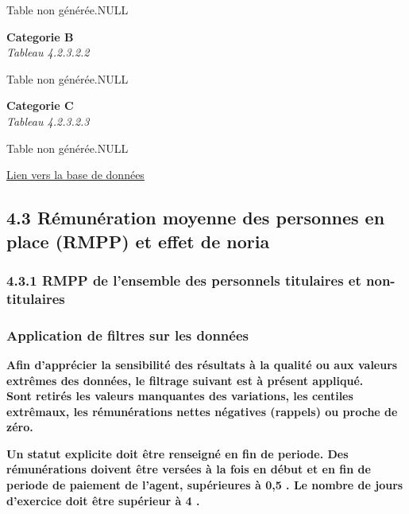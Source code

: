 Table non générée.NULL

\textbf{Categorie B}\\
\hspace*{0.333em}\emph{Tableau 4.2.3.2.2}

Table non générée.NULL

\textbf{Categorie C}\\
\hspace*{0.333em}\emph{Tableau 4.2.3.2.3}

Table non générée.NULL

\href{../Bases/Remunerations/Analyse.variations.par.exercice.csv}{Lien vers
la base de données}

\hypertarget{remuneration-moyenne-des-personnes-en-place-rmpp-et-effet-de-noria}{%
\subsection{4.3 Rémunération moyenne des personnes en place (RMPP) et
effet de
noria}\label{remuneration-moyenne-des-personnes-en-place-rmpp-et-effet-de-noria}}

\hypertarget{rmpp-de-lensemble-des-personnels-titulaires-et-non-titulaires}{%
\subsubsection{4.3.1 RMPP de l'ensemble des personnels titulaires et
non-titulaires}\label{rmpp-de-lensemble-des-personnels-titulaires-et-non-titulaires}}

\hypertarget{application-de-filtres-sur-les-donnees}{%
\subsubsection{Application de filtres sur les
données}\label{application-de-filtres-sur-les-donnees}}

\textbf{Afin d'apprécier la sensibilité des résultats à la qualité ou
aux valeurs extrêmes des données, le filtrage suivant est à présent
appliqué.}\\
\textbf{Sont retirés les valeurs manquantes des variations, les centiles
extrêmaux, les rémunérations nettes négatives (rappels) ou proche de
zéro.}

\textbf{Un statut explicite doit être renseigné en fin de periode. Des
rémunérations doivent être versées à la fois en début et en fin de
periode de paiement de l'agent, supérieures à 0,5 . Le nombre de jours
d'exercice doit être supérieur à 4 .}

